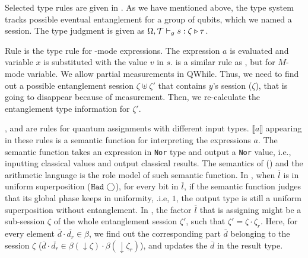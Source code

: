 

Selected type rules are given in .
As we have mentioned above, the type system tracks 
possible eventual entanglement for a group of qubits, which we named a session.
The type judgment is given as $\Omega,\mathcal{T}\vdash_g s : \zeta\triangleright \tau$.

Rule  is the type rule for \cmode-mode expressions.
The expression $a$ is evaluated and variable $x$ is substituted with the value $v$ in $s$.
 is a similar rule as , but for $M$-mode variable.
We allow partial measurements in QWhile.
Thus, we need to find out a possible entanglement session $\zeta\uplus \zeta'$ that contains $y$'s session ($\zeta$), that is going to disappear because of measurement.
Then, we re-calculate the entanglement type information for $\zeta'$.

,  and  are rules for quantum assignments with different input types.
$\llbracket a \rrbracket$ appearing in these rules is a semantic function for interpreting the expressions $a$.
The semantic function takes an expression in \texttt{Nor} type and output a \texttt{Nor} value,
i.e., inputting classical values and output classical results.
The semantics of \oqasm () and the arithmetic language \sourcelang
is the role model of such semantic function.
In , when $\overline{l}$ is in uniform superposition ($\texttt{Had}~{\bigcirc}$),
for every bit in $\overline{l}$, if the semantic function judges that its global phase keeps in uniformity, .i.e, $1$,
the output type is still a uniform superposition without entanglement.
In , the factor $\overline{l}$ that is assigning
might be a sub-session $\zeta$ of the whole entanglement session $\zeta'$,
such that $\zeta'= \zeta\cdot \zeta_r$.
Here, for every element $\overline{d}\cdot\overline{d_r}\in\beta$,
we find out the corresponding part $\overline{d}$ belonging to the session
$\zeta$ ($\overline{d}\cdot\overline{d_r}\in\beta(\downarrow\zeta)\cdot\beta(\downarrow\zeta_r)$),
and updates the $\overline{d}$ in the result type.


